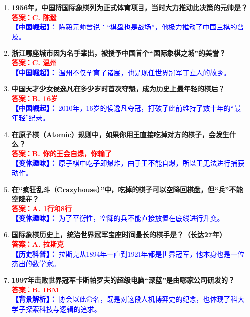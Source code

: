 \documentclass[a4paper, 11pt]{ctexart}
\begin{document}
\begin{enumerate}[label=\arabic*., itemsep=1.5em]
    \item \textbf{1956年，中国将国际象棋列为正式体育项目，当时大力推动此决策的元帅是？} \\
    \textcolor{red}{\textbf{答案：C. 陈毅}} \\
    \textcolor{blue}{\textbf{【中国崛起】：} 陈毅元帅曾说：“棋盘也是战场”，他极力推动了中国三棋的普及。}

    \item \textbf{浙江哪座城市因为名手辈出，被授予中国首个“国际象棋之城”的美誉？} \\
    \textcolor{red}{\textbf{答案：C. 温州}} \\
    \textcolor{blue}{\textbf{【中国崛起】：} 温州不仅孕育了诸宸，也是现任世界冠军丁立人的故乡。}

    \item \textbf{中国天才少女侯逸凡在多少岁时首次夺魁，成为历史上最年轻的棋后？} \\
    \textcolor{red}{\textbf{答案：B. 16岁}} \\
    \textcolor{blue}{\textbf{【中国崛起】：} 2010年，16岁的侯逸凡夺冠，打破了此前维持了数十年的“最年轻”纪录。}

    \item \textbf{在原子棋（Atomic）规则中，如果你用王直接吃掉对方的棋子，会发生什么？} \\
    \textcolor{red}{\textbf{答案：B. 你的王会自爆，你输了}} \\
    \textcolor{blue}{\textbf{【变体趣味】：} 原子棋中吃子即爆炸，由于王不能自爆，所以王无法进行捕获动作。}

    \item \textbf{在“疯狂乱斗（Crazyhouse）”中，吃掉的棋子可以空降回棋盘，但“兵”不能空降在？} \\
    \textcolor{red}{\textbf{答案：A. 1行和8行}} \\
    \textcolor{blue}{\textbf{【变体趣味】：} 为了平衡性，空降的兵不能直接放置在底线进行升变。}

    \item \textbf{国际象棋历史上，统治世界冠军宝座时间最长的棋手是？（长达27年）} \\
    \textcolor{red}{\textbf{答案：A. 拉斯克}} \\
    \textcolor{blue}{\textbf{【历史科普】：} 拉斯克从1894年一直到1921年都是世界冠军，他本身也是一位杰出的数学家。}

    \item \textbf{1997年击败世界冠军卡斯帕罗夫的超级电脑“深蓝”是由哪家公司研发的？} \\
    \textcolor{red}{\textbf{答案：B. IBM}} \\
    \textcolor{blue}{\textbf{【背景解析】：} 协会以此命名，既是对这段人机博弈史的纪念，也体现了科大学子探索科技与逻辑的追求。}


\end{enumerate}
\end{document}
